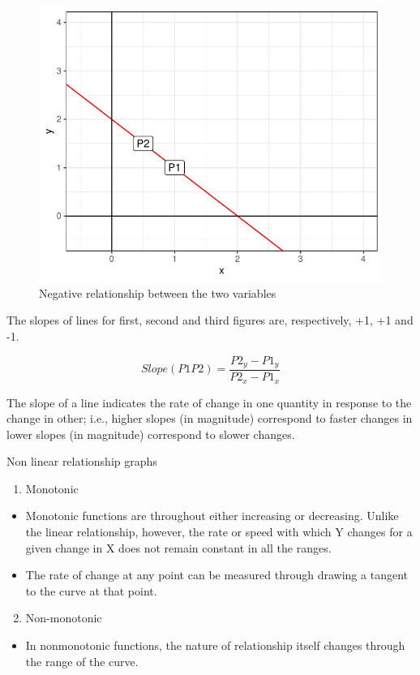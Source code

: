\documentclass[12pt,ignorenonframetext,aspectratio=169]{beamer}
\providecommand{\tightlist}{%
  \setlength{\itemsep}{0pt}\setlength{\parskip}{0pt}}
\begin{document}
\begin{frame}{}
\protect\hypertarget{section-10}{}
\begin{figure}
\includegraphics[width=0.45\linewidth]{02-production_economics_files/figure-beamer/linear-relationship-negative-1} \caption{Negative relationship between the two variables}\label{fig:linear-relationship-negative}
\end{figure}

The slopes of lines for first, second and third figures are,
respectively, +1, +1 and -1.
\end{frame}

\begin{frame}{}
\protect\hypertarget{section-11}{}
\[
Slope(P1P2) = \frac{P2_y - P1_y}{P2_x - P1_x}
\]

The slope of a line indicates the rate of change in one quantity in
response to the change in other; i.e., higher slopes (in magnitude)
correspond to faster changes in lower slopes (in magnitude) correspond
to slower changes.
\end{frame}

\begin{frame}{Non linear relationship graphs}
\protect\hypertarget{non-linear-relationship-graphs}{}
\begin{enumerate}
\tightlist
\item
  Monotonic
\end{enumerate}

\begin{itemize}
\tightlist
\item
  Monotonic functions are throughout either increasing or decreasing.
  Unlike the linear relationship, however, the rate or speed with which
  Y changes for a given change in X does not remain constant in all the
  ranges.
\item
  The rate of change at any point can be measured through drawing a
  tangent to the curve at that point.
\end{itemize}

\begin{enumerate}
\setcounter{enumi}{1}
\tightlist
\item
  Non-monotonic
\end{enumerate}

\begin{itemize}
\tightlist
\item
  In nonmonotonic functions, the nature of relationship itself changes
  through the range of the curve.
\end{itemize}
\end{frame}
\end{document}
